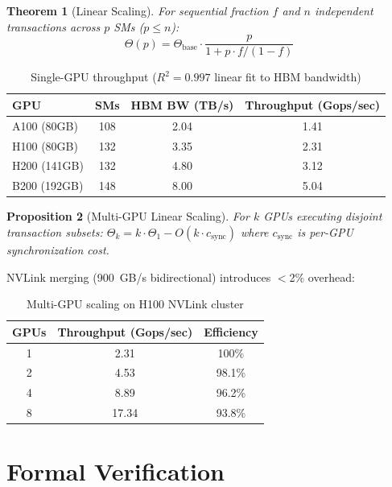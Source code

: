 \documentclass[11pt,letterpaper]{article}
\newtheorem{theorem}{Theorem}
\newtheorem{proposition}[theorem]{Proposition}
\theoremstyle{definition}
\theoremstyle{remark}
\begin{document}
\begin{theorem}[Linear Scaling]
\label{thm:linear}
For sequential fraction $f$ and $n$ independent transactions across $p$ SMs ($p \leq n$):
\begin{equation}
\Theta(p) = \Theta_{\text{base}} \cdot \frac{p}{1 + p \cdot f / (1 - f)}
\end{equation}
\end{theorem}

\begin{table}[h]
\centering
\begin{tabular}{lccc}
\toprule
\textbf{GPU} & \textbf{SMs} & \textbf{HBM BW (TB/s)} & \textbf{Throughput (Gops/sec)} \\
\midrule
A100 (80GB) & 108 & 2.04 & 1.41 \\
H100 (80GB) & 132 & 3.35 & 2.31 \\
H200 (141GB) & 132 & 4.80 & 3.12 \\
B200 (192GB) & 148 & 8.00 & 5.04 \\
\bottomrule
\end{tabular}
\caption{Single-GPU throughput ($R^2 = 0.997$ linear fit to HBM bandwidth)}
\label{tab:gpu-throughput}
\end{table}

\begin{proposition}[Multi-GPU Linear Scaling]
For $k$ GPUs executing disjoint transaction subsets:
$\Theta_k = k \cdot \Theta_1 - O(k \cdot c_{\text{sync}})$
where $c_{\text{sync}}$ is per-GPU synchronization cost.
\end{proposition}

NVLink merging (900~GB/s bidirectional) introduces $<$2\% overhead:

\begin{table}[h]
\centering
\begin{tabular}{ccc}
\toprule
\textbf{GPUs} & \textbf{Throughput (Gops/sec)} & \textbf{Efficiency} \\
\midrule
1 & 2.31 & 100\% \\
2 & 4.53 & 98.1\% \\
4 & 8.89 & 96.2\% \\
8 & 17.34 & 93.8\% \\
\bottomrule
\end{tabular}
\caption{Multi-GPU scaling on H100 NVLink cluster}
\label{tab:multigpu}
\end{table}

\section{Formal Verification}
\label{sec:formal}
\end{document}

